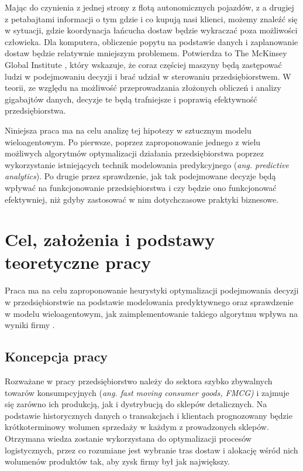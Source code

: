 \documentclass[polish, twoside, 12pt, a4paper]{article}
\theoremstyle{definition}
\theoremstyle{plain}
\theoremstyle{remark}
\begin{document}
Mając do czynienia z jednej strony z flotą autonomicznych pojazdów, z a drugiej z petabajtami informacji o tym gdzie i co kupują nasi klienci, możemy znaleźć się w sytuacji, gdzie koordynacja łańcucha dostaw będzie wykraczać poza możliwości człowieka. Dla komputera, obliczenie popytu na podstawie danych i zaplanowanie dostaw będzie relatywnie mniejszym problemem. Potwierdza to The McKinsey Global Institute \cite{McKinsey2011}, który wskazuje, że coraz częściej maszyny będą zastępować ludzi w podejmowaniu decyzji i brać udział w sterowaniu przedsiębiorstwem. W teorii, ze względu na możliwość przeprowadzania złożonych obliczeń i analizy gigabajtów danych, decyzje te będą trafniejsze i poprawią efektywność przedsiębiorstwa. 

Niniejsza praca ma na celu analizę tej hipotezy w sztucznym modelu wieloagentowym. Po pierwsze, poprzez zaproponowanie jednego z wielu możliwych algorytmów optymalizacji działania przedsiębiorstwa poprzez wykorzystanie istniejących technik modelowania predykcyjnego (\textit{ang. predictive analytics}). Po drugie przez sprawdzenie, jak tak podejmowane decyzje będą wpływać na funkcjonowanie przedsiębiorstwa i czy będzie ono funkcjonować efektywniej, niż gdyby zastosować w nim dotychczasowe praktyki biznesowe.


\clearpage

\section{Cel, założenia i podstawy teoretyczne pracy}

Praca ma na celu zaproponowanie heurystyki optymalizacji podejmowania decyzji w przedsiębiorstwie na podstawie modelowania predyktywnego oraz sprawdzenie w modelu wieloagentowym, jak zaimplementowanie takiego algorytmu wpływa na wyniki firmy .  

\subsection{Koncepcja pracy}

Rozważane w pracy przedsiębiorstwo należy do sektora szybko zbywalnych towarów konsumpcyjnych (\textit{ang. fast moving consumer goods, FMCG)} i zajmuje się zarówno ich produkcją, jak i dystrybucją do sklepów detalicznych. Na podstawie historycznych danych o transakcjach i klientach prognozowany będzie krótkoterminowy wolumen sprzedaży w każdym z prowadzonych sklepów. Otrzymana wiedza zostanie wykorzystana do optymalizacji procesów logistycznych, przez co rozumiane jest wybranie tras dostaw i alokację wśród nich wolumenów produktów tak, aby zysk firmy był jak największy. 
\end{document}
